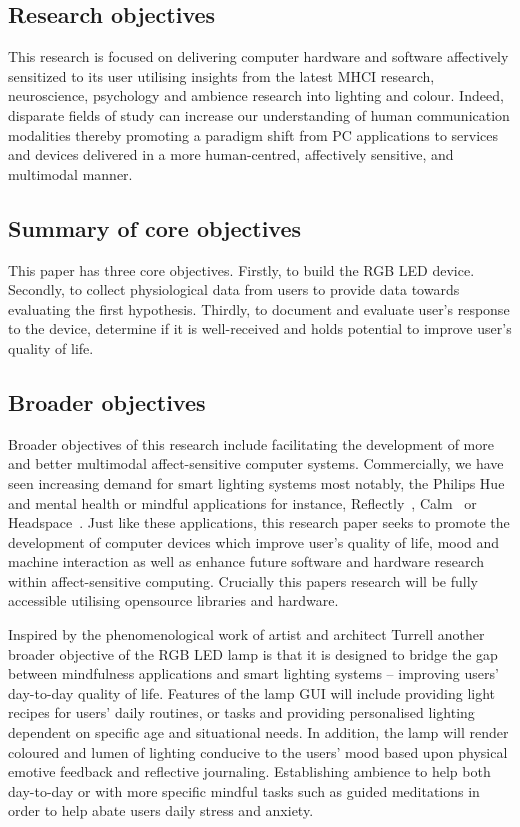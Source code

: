 \documentclass{sigchi}
\begin{document}
\subsection{Research objectives}

This research is focused on delivering computer hardware and software affectively sensitized to its user utilising insights from the latest MHCI research, neuroscience, psychology and ambience research into lighting and colour. Indeed, disparate fields of study can increase our understanding of human communication modalities thereby promoting a paradigm shift from PC applications to services and devices delivered in a more human-centred, affectively sensitive, and multimodal manner. 

\subsection{Summary of core objectives}

This paper has three core objectives. Firstly, to build the RGB LED device. Secondly, to collect physiological data from users to provide data towards evaluating the first hypothesis. Thirdly, to document and evaluate user’s response to the device, determine if it is well-received and holds potential to improve user’s quality of life.

\subsection{Broader objectives}

Broader objectives of this research include facilitating the development of more and better multimodal affect-sensitive computer systems. Commercially, we have seen increasing demand for smart lighting systems most notably, the Philips Hue~\cite{Phillips01} and mental health or mindful applications for instance, Reflectly~\cite{Reflectly01}, Calm~\cite{Calm01} or Headspace~\cite{Headspace01}. Just like these applications, this research paper seeks to promote the development of computer devices which improve user’s quality of life, mood and machine interaction as well as enhance future software and hardware research within affect-sensitive computing. Crucially this papers research will be fully accessible utilising opensource libraries and hardware. 

Inspired by the phenomenological work of artist and architect Turrell another broader objective of the RGB LED lamp is that it is designed to bridge the gap between mindfulness applications and smart lighting systems – improving users’ day-to-day quality of life. Features of the lamp GUI will include providing light recipes for users’ daily routines, or tasks and providing personalised lighting dependent on specific age and situational needs. In addition, the lamp will render coloured and lumen of lighting conducive to the users’ mood based upon physical emotive feedback and reflective journaling. Establishing ambience to help both day-to-day or with more specific mindful tasks such as guided meditations in order to help abate users daily stress and anxiety.
\end{document}
